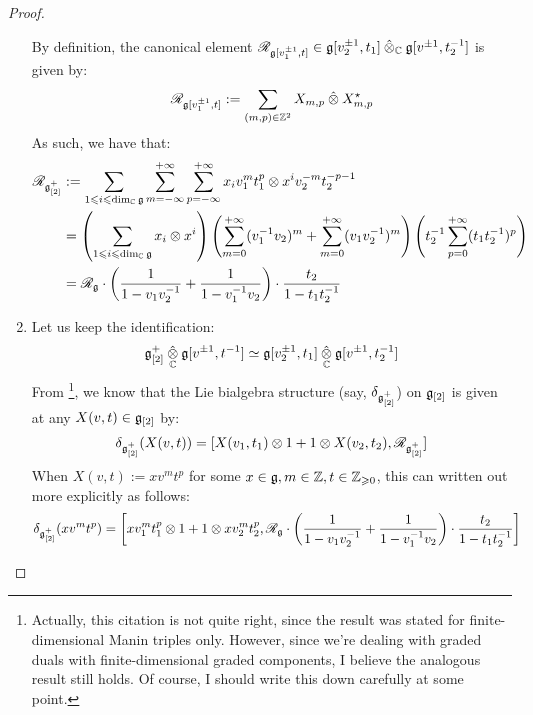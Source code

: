 \begin{proof}
\begin{enumerate}
                        By definition, the canonical element $\scrR_{\g[v_1^{\pm 1}, t]} \in \g[v_2^{\pm 1}, t_1] \hattensor_{\bbC} \g[v^{\pm 1}, t_2^{-1}]$ is given by:
                            $$\scrR_{\g[v_1^{\pm 1}, t]} := \sum_{(m, p) \in \Z^2} X_{m, p} \hattensor X_{m, p}^{\star}$$
                        As such, we have that:
                            $$
                                \begin{aligned}
                                    \scrR_{\g_{[2]}^+} & := \sum_{1 \leq i \leq \dim_{\bbC} \g} \sum_{m = -\infty}^{+\infty} \sum_{p = -\infty}^{+\infty} x_i v_1^m t_1^p \tensor x^i v_2^{-m} t_2^{-p - 1}
                                    \\
                                    & = \left( \sum_{1 \leq i \leq \dim_{\bbC} \g} x_i \tensor x^i \right) \left( \sum_{m = 0}^{+\infty} (v_1^{-1} v_2)^m + \sum_{m = 0}^{+\infty} (v_1 v_2^{-1})^m \right) \left( t_2^{-1} \sum_{p = 0}^{+\infty} (t_1 t_2^{-1})^p \right)
                                    \\
                                    & = \scrR_{\g} \cdot \left( \frac{1}{1 - v_1 v_2^{-1}} + \frac{1}{1 - v_1^{-1} v_2} \right) \cdot \frac{t_2}{1 - t_1 t_2^{-1}}
                                \end{aligned}
                            $$
                        \item Let us keep the identification:
                            $$\g_{[2]}^+ \hattensor_{\bbC} \g[v^{\pm 1}, t^{-1}] \cong \g[v_2^{\pm 1}, t_1] \hattensor_{\bbC} \g[v^{\pm 1}, t_2^{-1}]$$
                        From \cite[pp. 5]{etingof_kazhdan_quantisation_1}\footnote{Actually, this citation is not quite right, since the result was stated for finite-dimensional Manin triples only. However, since we're dealing with graded duals with finite-dimensional graded components, I believe the analogous result still holds. Of course, I should write this down carefully at some point.}, we know that the Lie bialgebra structure (say, $\delta_{\g_{[2]}^+}$) on $\g_{[2]}$ is given at any $X(v, t) \in \g_{[2]}$ by:
                            $$\delta_{\g_{[2]}^+}( X(v, t) ) = [X(v_1, t_1) \tensor 1 + 1 \tensor X(v_2, t_2), \scrR_{\g_{[2]}^+}]$$
                        When $X(v, t) := x v^m t^p$ for some $x \in \g, m \in \Z, t \in \Z_{\geq 0}$, this can written out more explicitly as follows:
                            $$
                                \begin{aligned}
                                    \delta_{\g_{[2]}^+}( x v^m t^p ) & = \left[x v_1^m t_1^p \tensor 1 + 1 \tensor x v_2^m t_2^p, \scrR_{\g} \cdot \left( \frac{1}{1 - v_1 v_2^{-1}} + \frac{1}{1 - v_1^{-1} v_2} \right) \cdot \frac{t_2}{1 - t_1 t_2^{-1}}\right]

\end{aligned}$$
\end{enumerate}
\end{proof}
